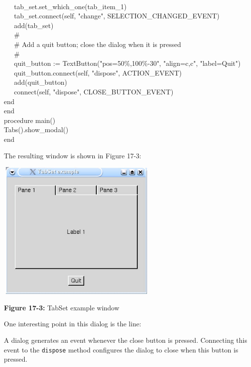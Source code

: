 {\ \\
\>   \ \ \ tab\_set.set\_which\_one(tab\_item\_1) \\
\>   \ \ \ tab\_set.connect(self, "change",
SELECTION\_CHANGED\_EVENT) \\
\>   \ \ \ add(tab\_set) \\
\>   \ \ \ \# \\
\>   \ \ \ \# Add a quit button; close the dialog when it is pressed \\
\>   \ \ \ \# \\
\>   \ \ \ quit\_button :=
TextButton("pos=50\%,100\%-30",
"align=c,c",
"label=Quit") \\
\>   \ \ \ quit\_button.connect(self,
"dispose", ACTION\_EVENT) \\
\>   \ \ \ add(quit\_button) \\
\>   \ \ \ connect(self, "dispose",
CLOSE\_BUTTON\_EVENT) \\
\>   end \\
end \\
procedure main() \\
\>   Tabs().show\_modal() \\
end
}


The resulting window is shown in Figure 17-3:

\begin{center}
\includegraphics[width=3.1272in,height=2.7299in]{ub-img/ub-img52.jpg}
\end{center}

{\sffamily\bfseries Figure 17-3:}
{\sffamily TabSet example window}

\bigskip

\noindent One interesting point in this dialog is the line:



\noindent A dialog generates an event whenever the close button is
pressed. Connecting this event to the \texttt{dispose}
method configures the dialog to close when this button is
pressed.

